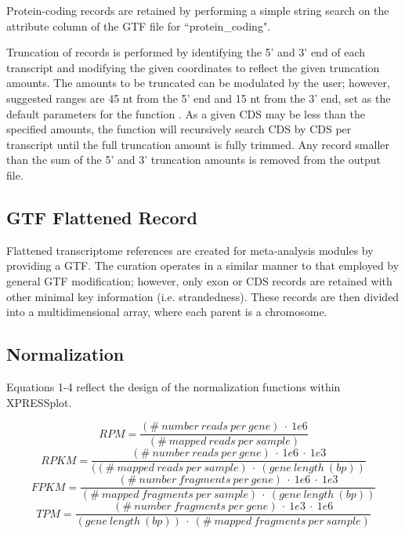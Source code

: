 \documentclass[11pt, a4paper, oneside]{article}
\begin{document}
Protein-coding records are retained by performing a simple string search on the attribute column of the GTF file for ``protein\_coding". \par

Truncation of records is performed by identifying the 5' and 3' end of each transcript and modifying the given coordinates to reflect the given truncation amounts. The amounts to be truncated can be modulated by the user; however, suggested ranges are 45 nt from the 5' end and 15 nt from the 3' end, set as the default parameters for the function \cite{ingolia_meth}. As a given CDS may be less than the specified amounts, the function will recursively search CDS by CDS per transcript until the full truncation amount is fully trimmed. Any record smaller than the sum of the 5' and 3' truncation amounts is removed from the output file. \par

\subsection{GTF Flattened Record}
Flattened transcriptome references are created for meta-analysis modules by providing a GTF. The curation operates in a similar manner to that employed by general GTF modification; however, only exon or CDS records are retained with other minimal key information (i.e. strandedness). These records are then divided into a multidimensional array, where each parent is a chromosome. \par

\subsection{Normalization}
Equations 1-4 reflect the design of the normalization functions within XPRESSplot.

  \begin{equation}
    RPM = \frac{(\#\ number\ reads\ per\ gene)\ \cdot\ 1e6}{(\#\ mapped\ reads\ per\ sample)}
  \end{equation}
  \begin{equation}
    RPKM = \frac{(\#\ number\ reads\ per\ gene)\ \cdot\ 1e6\ \cdot\ 1e3}{((\#\ mapped\ reads\ per\ sample)\ \cdot\ (gene\ length\ (bp))}
  \end{equation}
  \begin{equation}
    FPKM = \frac{(\#\ number\ fragments\ per\ gene)\ \cdot\ 1e6\ \cdot\ 1e3}{(\#\ mapped\ fragments\ per\ sample)\ \cdot\ (gene\ length\ (bp))}
  \end{equation}
  \begin{equation}
    TPM = \frac{(\#\ number\ fragments\ per\ gene)\ \cdot\ 1e3\ \cdot\ 1e6}{(gene\ length\ (bp))\ \cdot\ (\#\ mapped\ fragments\ per\ sample)}
  \end{equation}
\end{document}
